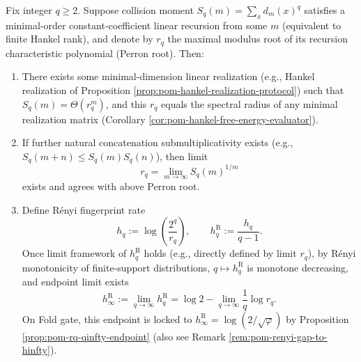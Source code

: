 \begin{proposition}\label{prop:pom-collision-renyi-perron-closure}
Fix integer \(q\ge 2\).
Suppose collision moment \(S_q(m)=\sum_x d_m(x)^q\) satisfies a minimal-order constant-coefficient linear recursion from some \(m\) (equivalent to finite Hankel rank), and denote by \(r_q\) the maximal modulus root of its recursion characteristic polynomial (Perron root).
Then:
\begin{enumerate}
  \item There exists some minimal-dimension linear realization (e.g., Hankel realization of Proposition \ref{prop:pom-hankel-realization-protocol}) such that
  \(
  S_q(m)=\Theta(r_q^m)
  \), and this \(r_q\) equals the spectral radius of any minimal realization matrix (Corollary \ref{cor:pom-hankel-free-energy-evaluator}).
  \item If further natural concatenation submultiplicativity exists (e.g., \(S_q(m+n)\le S_q(m)S_q(n)\)), then limit
  \[
  \boxed{\ r_q=\lim_{m\to\infty}S_q(m)^{1/m}\ }
  \]
  exists and agrees with above Perron root.
  \item Define Rényi fingerprint rate
  \[
  h_q:=\log\!\left(\frac{2^q}{r_q}\right),
  \qquad
  h_q^{\mathrm R}:=\frac{h_q}{q-1}.
  \]
  Once limit framework of \(h_q^{\mathrm R}\) holds (e.g., directly defined by limit \(r_q\)),
  by Rényi monotonicity of finite-support distributions, \(q\mapsto h_q^{\mathrm R}\) is monotone decreasing, and endpoint limit exists
  \[
  h_\infty^{\mathrm R}:=\lim_{q\to\infty}h_q^{\mathrm R}
  =\log 2-\lim_{q\to\infty}\frac{1}{q}\log r_q.
  \]
  On Fold gate, this endpoint is locked to \(h_\infty^{\mathrm R}=\log(2/\sqrt{\varphi})\) by Proposition \ref{prop:pom-rq-qinfty-endpoint} (also see Remark \ref{rem:pom-renyi-gap-to-hinfty}).
\end{enumerate}
\end{proposition}

